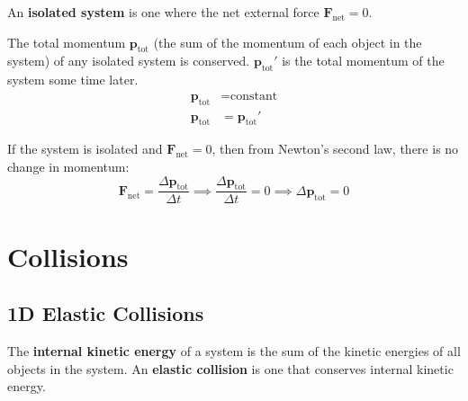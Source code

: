 \documentclass{article}
\newcommand{\definition}[1]{\begin{tcolorbox}[colback=red!5!white,colframe=red!75!black,parbox=false] #1 \end{tcolorbox}}
\newcommand{\theorem}[2]{\begin{tcolorbox}[title={#1},colback=blue!5!white,colframe=blue!75!black,parbox=false] #2 \end{tcolorbox}}
\begin{document}
\definition{An \textbf{isolated system} is one where the net external force $\mathbf{F}_\text{net}=0$.}

\theorem{Conservation of momentum}{The total momentum $\mathbf{p}_\text{tot}$ (the sum of the momentum of each object in the system) of any isolated system is conserved. $\mathbf{p}_\text{tot}'$ is the total momentum of the system some time later.
\begin{align*}
	\mathbf{p}_\text{tot}&=\text{constant} \\
	\mathbf{p}_\text{tot}&=\mathbf{p}_\text{tot}'
\end{align*}}

If the system is isolated and $\mathbf{F}_\text{net}=0$, then from Newton's second law, there is no change in momentum:
\begin{equation*}
	\mathbf{F}_\text{net}=\frac{\Delta \mathbf{p}_\text{tot}}{\Delta t}
	\implies \frac{\Delta \mathbf{p}_\text{tot}}{\Delta t}=0
	\implies \Delta \mathbf{p}_\text{tot}=0
\end{equation*}


\section{Collisions}

\subsection{1D Elastic Collisions}

\definition{The \textbf{internal kinetic energy} of a system is the sum of the kinetic energies of all objects in the system. An \textbf{elastic collision} is one that conserves internal kinetic energy.}
\end{document}
